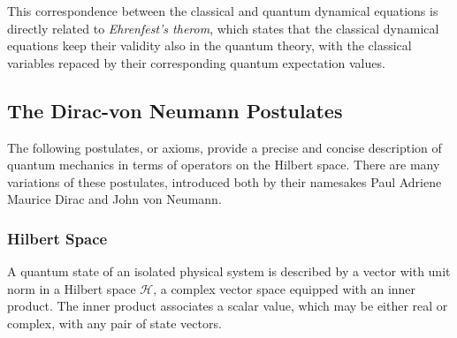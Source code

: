     This correspondence between the classical and quantum dynamical equations is 
    directly related to \emph{Ehrenfest's therom}, which states that the classical 
    dynamical equations keep their validity also in the quantum theory, with the 
    classical variables repaced by their corresponding quantum expectation
    values\cite{ehrenfest1927bemerkung}.

\subsection{The Dirac-von Neumann Postulates}

    The following postulates, or axioms, provide a precise and concise description 
    of quantum mechanics in terms of operators on the Hilbert space. There are
    many variations of these postulates, introduced both by their namesakes 
    Paul Adriene Maurice Dirac\cite{dirac1930principles} and John von 
    Neumann\cite{vonNeumann1932foundations}.

    \subsubsection{Hilbert Space}
    A quantum state of an isolated physical system is described by a vector
    with unit norm in a Hilbert space $\mathcal{H}$, 
    a complex vector space equipped with an inner product. The inner product 
    associates a scalar value, which may be either real or complex, with any pair
    of state vectors.
    
